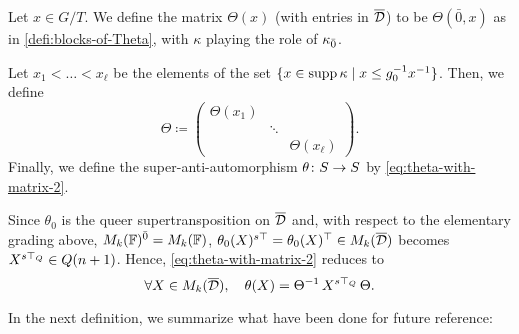 \begin{defi}\label{defi:blocks-of-Theta-odd}
    Let $x \in G/T$. 
    We define the matrix $\Theta(x)$ (with entries in $\barr \D$) to be $\Theta(\bar 0, x)$ as in \cref{defi:blocks-of-Theta}, with $\kappa$ playing the role of $\kappa_{\bar{0}}$. 
\end{defi}

Let $x_1 < \ldots < x_{\ell}$ be the elements of the set $\{ x \in \operatorname{supp} \kappa \mid x \leq g_0^{-1} x^{-1} \}$. 
Then, we define 
\[\label{eq:puting-the-blocks-of-Phi-together-version-A}
    \Theta \coloneqq
    \begin{pmatrix}
        \Theta(x_1)&& \\
        & \ddots &\\
        && \Theta(x_{\ell})
    \end{pmatrix}.
\]
%
Finally, we define the super-anti-automorphism $\theta\colon S\to S$ by \cref{eq:theta-with-matrix-2}. 

Since $\theta_0$ is the queer supertransposition on $\barr \D$ and, with respect to the elementary grading above, $M_{k}(\mathbb{F})^{\bar0} = M_{k}(\mathbb{F})$, $\theta_0(X)\stransp = \theta_0(X)\transp \in M_{k} (\barr \D)$ becomes $X^{s\top_Q} \in Q(n+1)$. 
Hence, \cref{eq:theta-with-matrix-2} reduces to 
\[\label{eq:theta-with-matrix-4}
    \forall X\in M_{k} (\barr \D), \quad \theta(X) = \Theta\inv\, X\sTq\, \Theta.
\]

In the next definition, we summarize what have been done for future reference:


